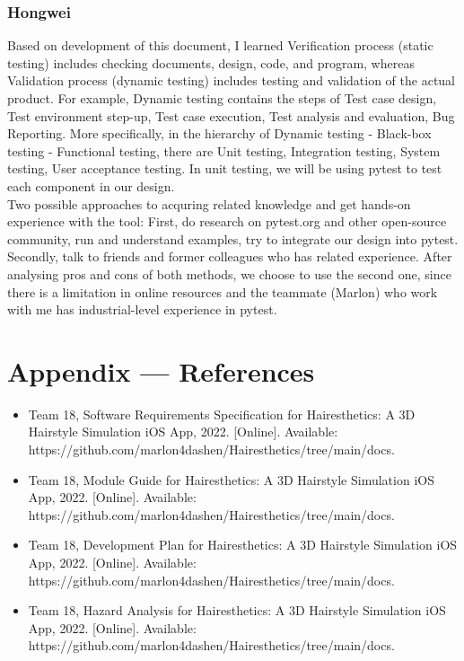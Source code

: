 \documentclass[12pt, titlepage]{article}
\begin{document}
\subsubsection{Hongwei}
Based on development of this document, I learned Verification process (static testing) includes checking documents, design, code, and program, whereas Validation process (dynamic testing) includes testing and validation of the actual product. For example, Dynamic testing contains the steps of Test case design, Test environment step-up, Test case execution, Test analysis and evaluation, Bug Reporting. More specifically, in the hierarchy of Dynamic testing - Black-box testing - Functional testing, there are Unit testing, Integration testing, System testing, User acceptance testing. In unit testing, we will be using pytest to test each component in our design.\\
\newline
Two possible approaches to acquring related knowledge and get hands-on experience with the tool: First, do research on pytest.org and other open-source community, run and understand examples, try to integrate our design into pytest. Secondly, talk to friends and former colleagues who has related experience. After analysing pros and cons of both methods, we choose to use the second one, since there is a limitation in online resources and the teammate (Marlon) who work with me has industrial-level experience in pytest.
\medskip

\newpage
\section*{Appendix --- References}

\begin{itemize}
    \item Team 18, Software Requirements Specification for Hairesthetics: A 3D Hairstyle Simulation iOS App, 2022. [Online]. Available: https://github.com/marlon4dashen/Hairesthetics/tree/main/docs.
    \item Team 18, Module Guide for Hairesthetics: A 3D Hairstyle Simulation iOS App, 2022. [Online]. Available: https://github.com/marlon4dashen/Hairesthetics/tree/main/docs.
    \item Team 18, Development Plan for Hairesthetics: A 3D Hairstyle Simulation iOS App, 2022. [Online]. Available: https://github.com/marlon4dashen/Hairesthetics/tree/main/docs.
    \item Team 18, Hazard Analysis for Hairesthetics: A 3D Hairstyle Simulation iOS App, 2022. [Online]. Available: https://github.com/marlon4dashen/Hairesthetics/tree/main/docs.
\end{itemize}
\end{document}
